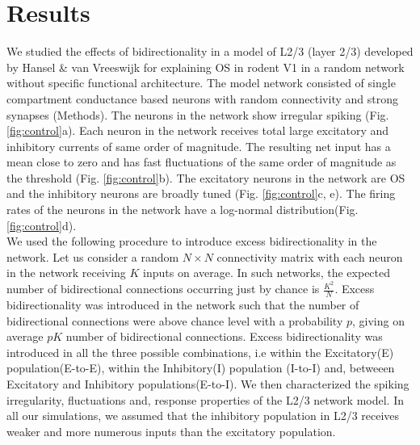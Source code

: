 \section{Results}
We studied the effects of bidirectionality in a model of L2/3 (layer 2/3) developed by Hansel \& van Vreeswijk \cite{Hansel2012} for explaining OS in rodent V1 in a random network without specific functional architecture. The model network consisted of single compartment conductance based neurons with random connectivity and strong synapses (Methods). The neurons in the network show irregular spiking (Fig. \ref{fig:control}a). Each neuron in the network receives total large excitatory and inhibitory currents of same order of magnitude. The resulting net input has a mean close to zero and has fast fluctuations of the same order of magnitude as the threshold (Fig. \ref{fig:control}b). The excitatory neurons in the network are OS and the inhibitory neurons are broadly tuned (Fig. \ref{fig:control}c, e). The firing rates of the neurons in the network have a log-normal distribution(Fig. \ref{fig:control}d).  \\

We used the following procedure to introduce excess bidirectionality in the network. Let us consider a random $N \times N$ connectivity matrix with each neuron in the network receiving $K$ inputs on average. In such networks, the expected number of bidirectional connections occurring just by chance is $\frac{K^2}{N}$. Excess bidirectionality was introduced in the network such that the number of bidirectional connections were above chance level with a probability $p$, giving on average $pK$ number of bidirectional connections.
Excess bidirectionality was introduced in all the three possible combinations, i.e within the Excitatory(E) population(E-to-E), within the Inhibitory(I) population (I-to-I) and, betweeen Excitatory and Inhibitory populations(E-to-I). We then characterized the spiking irregularity, fluctuations and, response properties of the L2/3 network model. In all our simulations, we assumed that the inhibitory population in L2/3 receives weaker and more numerous inputs than the excitatory population.   \\

